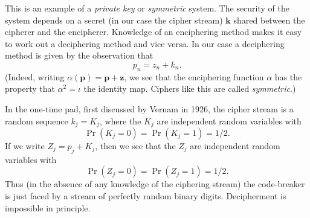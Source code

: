 \documentclass[12pt,a4paper]{article}
\theoremstyle{plain}
\theoremstyle{definition}
\begin{document}
    This is an example of a \emph{private key} or
    \emph{symmetric} system. The security of
    the system depends on a secret (in our
    case the cipher stream) ${\mathbf k}$
    shared between the cipherer and the encipherer.
    Knowledge of an enciphering method makes it
    easy to work out a deciphering method
    and vice versa. In our case a deciphering method
    is given by the observation that
    \[p_{n}=z_{n}+k_{n}.\]
    (Indeed, writing $\alpha(\mathbf{p})=\mathbf{p}+\mathbf{z}$,
    we see that the enciphering function $\alpha$ has
    the property that $\alpha^{2}=\iota$ the identity map.
    Ciphers like this are called \emph{symmetric}.)

    In the one-time pad, first discussed by
    Vernam in 1926, the cipher stream is a random
    sequence $k_{j}=K_{j}$, where the $K_{j}$ are
    independent random variables with
    \[\Pr(K_{j}=0)=\Pr(K_{j}=1)=1/2.\]
    If we write $Z_{j}=p_{j}+K_{j}$, then we see that
    the $Z_{j}$ are
    independent random variables with
    \[\Pr(Z_{j}=0)=\Pr(Z_{j}=1)=1/2.\]
    Thus (in the absence of any knowledge of the ciphering stream)
    the code-breaker is just faced by a stream of
    perfectly random binary digits. Decipherment
    is impossible in principle.
\end{document}
